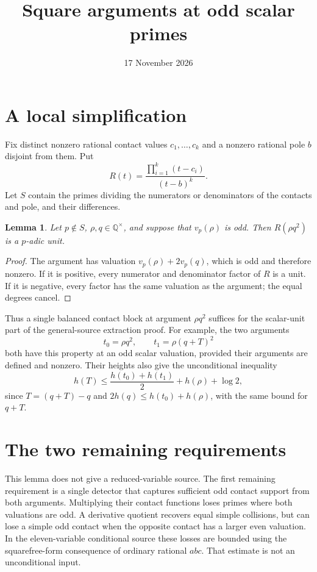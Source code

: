 \documentclass[11pt]{article}
\title{Square arguments at odd scalar primes}
\author{}\date{17 November 2026}
\newtheorem{lemma}{Lemma}
\newcommand{\Q}{\mathbb Q}
\begin{document}
\maketitle

\section{A local simplification}

Fix distinct nonzero rational contact values $c_1,\ldots,c_k$ and
a nonzero rational pole $b$ disjoint from them. Put
\[
 R(t)=\frac{\prod_{i=1}^k(t-c_i)}{(t-b)^k}.
\]
Let $S$ contain the primes dividing the numerators or denominators
of the contacts and pole, and their differences.

\begin{lemma}
Let $p\notin S$, $\rho,q\in\Q^\times$, and suppose that
$v_p(\rho)$ is odd. Then $R(\rho q^2)$ is a $p$-adic unit.
\end{lemma}
\begin{proof}
The argument has valuation $v_p(\rho)+2v_p(q)$, which is odd
and therefore nonzero. If it is positive, every numerator and
denominator factor of $R$ is a unit. If it is negative, every factor
has the same valuation as the argument; the equal degrees cancel.
\end{proof}

Thus a single balanced contact block at argument $\rho q^2$ suffices
for the scalar-unit part of the general-source extraction proof.
For example, the two arguments
\[
 t_0=\rho q^2,\qquad
 t_1=\rho(q+T)^2
\]
both have this property at an odd scalar valuation, provided their
arguments are defined and nonzero. Their heights also give the
unconditional inequality
\[
 h(T)\le \frac{h(t_0)+h(t_1)}2+h(\rho)+\log2,
\]
since $T=(q+T)-q$ and
$2h(q)\le h(t_0)+h(\rho)$, with the same bound for $q+T$.

\section{The two remaining requirements}

This lemma does not give a reduced-variable source. The first remaining
requirement is a single detector that captures sufficient odd contact
support from both arguments. Multiplying their contact functions loses
primes where both valuations are odd. A derivative quotient recovers
equal simple collisions, but can lose a simple odd contact when the
opposite contact has a larger even valuation. In the eleven-variable
conditional source these losses are bounded using the squarefree-form
consequence of ordinary rational $abc$. That estimate is not an
unconditional input.
\end{document}
